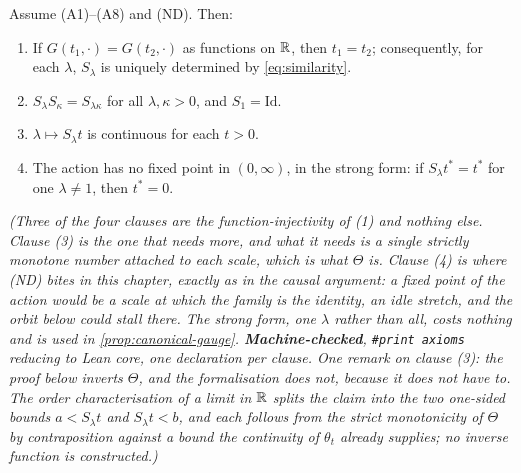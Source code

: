\begin{lemma}\label{lem:action-rigidity}
\leanok
{}
Assume (A1)--(A8) and (ND). Then:
\begin{enumerate}
\item If $G(t_1,\cdot) = G(t_2,\cdot)$ as functions on $\mathbb{R}$, then $t_1 = t_2$; consequently,
for each $\lambda$, $S_\lambda$ is uniquely determined by \ref{eq:similarity}.
\item $S_\lambda S_\kappa = S_{\lambda\kappa}$ for all $\lambda,\kappa > 0$, and
$S_1 = \mathrm{Id}$.
\item $\lambda \mapsto S_\lambda t$ is continuous for each $t > 0$.
\item The action has no fixed point in $(0,\infty)$, in the strong form: if
$S_\lambda t^* = t^*$ for one $\lambda \ne 1$, then $t^* = 0$.
\end{enumerate}
\statusT\quad\emph{(Three of the four clauses are the function-injectivity of (1) and nothing
else. Clause (3) is the one that needs more, and what it needs is a single strictly monotone
number attached to each scale, which is what $\Theta$ is. Clause (4) is where (ND) bites in
this chapter, exactly as in the causal argument: a fixed point of the action would be a scale
at which the family is the identity, an idle stretch, and the orbit below could stall there.
The strong form, one $\lambda$ rather than all, costs nothing and is used in
\ref{prop:canonical-gauge}. \textbf{Machine-checked}, \texttt{\#print axioms} reducing to Lean
core, one declaration per clause. One remark on clause (3): the proof below inverts $\Theta$,
and the formalisation does not, because it does not have to. The order characterisation of a
limit in $\mathbb{R}$ splits the claim into the two one-sided bounds $a < S_\lambda t$ and
$S_\lambda t < b$, and each follows from the strict monotonicity of $\Theta$ by contraposition
against a bound the continuity of $\theta_t$ already supplies; no inverse function is
constructed.)}
\end{lemma}

